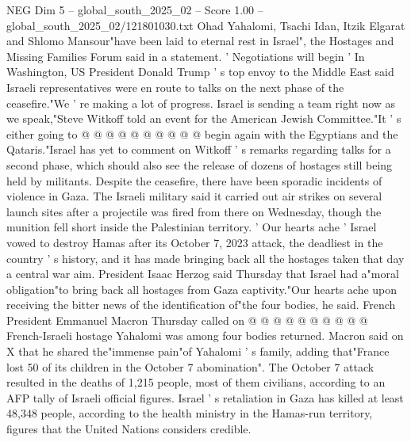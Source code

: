 \begin{textsample}{NEG Dim 5 – global\_south\_2025\_02 – Score 1.00 – global\_south\_2025\_02/121801030.txt}
Ohad Yahalomi, Tsachi Idan, Itzik Elgarat and Shlomo Mansour"have been laid to eternal rest in Israel", the Hostages and Missing Families Forum said in a statement. ' Negotiations will begin ' In Washington, US President Donald Trump ' s top envoy to the Middle East said Israeli representatives were en route to talks on the next phase of the ceasefire."We ' re making a lot of progress.
Israel is sending a team right now as we speak,"Steve Witkoff told an event for the American Jewish Committee."It ' s either going to @ @ @ @ @ @ @ @ @ @ begin again with the Egyptians and the Qataris."Israel has yet to comment on Witkoff ' s remarks regarding talks for a second phase, which should also see the release of dozens of hostages still being held by militants.
Despite the ceasefire, there have been sporadic incidents of violence in Gaza.
The Israeli military said it carried out air strikes on several launch sites after a projectile was fired from there on Wednesday, though the munition fell short inside the Palestinian territory. ' Our hearts ache ' Israel vowed to destroy Hamas after its October 7, 2023 attack, the deadliest in the country ' s history, and it has made bringing back all the hostages taken that day a central war aim.
President Isaac Herzog said Thursday that Israel had a"moral obligation"to bring back all hostages from Gaza captivity."Our hearts ache upon receiving the bitter news of the identification of"the four bodies, he said.
French President Emmanuel Macron Thursday called on @ @ @ @ @ @ @ @ @ @ French-Israeli hostage Yahalomi was among four bodies returned.
Macron said on X that he shared the"immense pain"of Yahalomi ' s family, adding that"France lost 50 of its children in the October 7 abomination".
The October 7 attack resulted in the deaths of 1,215 people, most of them civilians, according to an AFP tally of Israeli official figures.
Israel ' s retaliation in Gaza has killed at least 48,348 people, according to the health ministry in the Hamas-run territory, figures that the United Nations considers credible.

\end{textsample}
